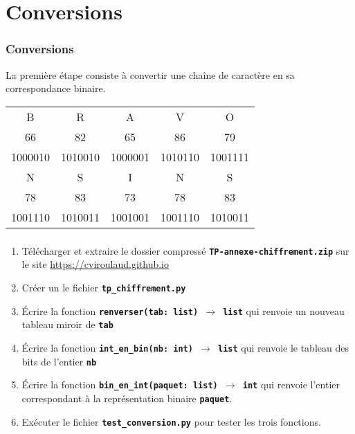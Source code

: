 \documentclass[svgnames,11pt]{beamer}
\begin{document}
\section{Conversions}
\begin{frame}
    \frametitle{Conversions}

    La première étape consiste à convertir une chaîne de caractère en sa correspondance binaire.
    \begin{center}
        \begin{tabular}{*{5}{c}}
            B       & R       & A       & V       & O       \\

            66      & 82      & 65      & 86      & 79      \\
            1000010 & 1010010 & 1000001 & 1010110 & 1001111 \\
            N       & S       & I       & N       & S       \\

            78      & 83      & 73      & 78      & 83      \\
            1001110 & 1010011 & 1001001 & 1001110 & 1010011 \\
        \end{tabular}
    \end{center}
\end{frame}
\begin{frame}
    \frametitle{}

    \begin{activite}
        \begin{enumerate}
            \item Télécharger et extraire le dossier compressé \textbf{\texttt{TP-annexe-chiffrement.zip}} sur le site \url{https://cviroulaud.github.io}
            \item Créer un le fichier \textbf{\texttt{tp\_chiffrement.py}}
            \item Écrire la fonction \textbf{\texttt{renverser(tab: list) $\rightarrow$ list}} qui renvoie un nouveau tableau miroir de \textbf{\texttt{tab}}
            \item Écrire la fonction \textbf{\texttt{int\_en\_bin(nb: int) $\rightarrow$ list}} qui renvoie le tableau des bits de l'entier \textbf{\texttt{nb}}
            \item Écrire la fonction \textbf{\texttt{bin\_en\_int(paquet: list) $\rightarrow$ int}} qui renvoie l'entier correspondant à la représentation binaire \textbf{\texttt{paquet}}.
            \item Exécuter le fichier \textbf{\texttt{test\_conversion.py}} pour tester les trois fonctions.
        \end{enumerate}
    \end{activite}

\end{frame}
\end{document}
